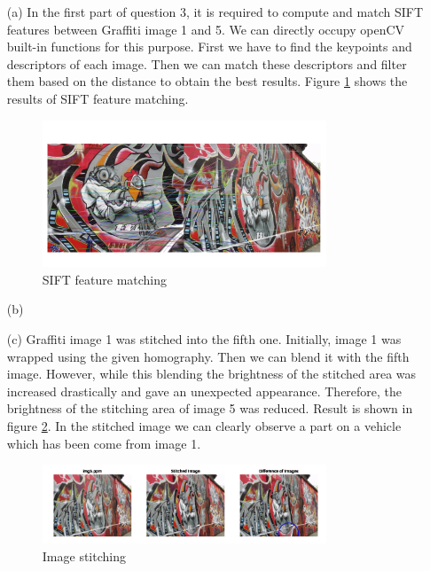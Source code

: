 \documentclass[11pt]{article}
\begin{document}
\begin{itemize}
    \item[(a)] In the first part of question 3, it is required to compute and match SIFT features between Graffiti image 1 and 5.
    We can directly occupy openCV built-in functions for this purpose. First we have to find the keypoints and descriptors of each image. Then we
    can match these descriptors and filter them based on the distance to obtain the best results. Figure \ref{SIFT feature matching} shows the 
    results of SIFT feature matching.

    \begin{figure}[!h]
        \centering
        \includegraphics[width=0.8\textwidth]{Images/31.png}
        \caption{SIFT feature matching}
        \label{SIFT feature matching}
    \end{figure}

    \item[(b)]
    \item[(c)] Graffiti image 1 was stitched into the fifth one. Initially, image 1 was wrapped using the given homography. Then we can blend it 
    with the fifth image. However, while this blending the brightness of the stitched area was increased drastically and gave an unexpected appearance.
    Therefore, the brightness of the stitching area of image 5 was reduced. Result is shown in figure \ref{Image stitching}. In the stitched image 
    we can clearly observe a part on a vehicle which has been come from image 1. 
    
    \begin{figure}[!h]
        \centering
        \includegraphics[width=0.8\textwidth]{Images/33.png}
        \caption{Image stitching}
        \label{Image stitching}
    \end{figure}
      
\end{itemize}

%
%
\end{document}
